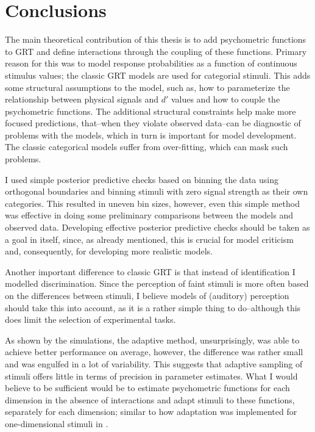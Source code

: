 \documentclass{article}\usepackage{knitr}
\begin{document}
\newpage


\section{Conclusions}

The main theoretical contribution of this thesis is to add psychometric functions to GRT and define interactions through the coupling of these functions. Primary reason for this was to model response probabilities as a function of continuous stimulus values; the classic GRT models are used for categorial stimuli. This adds some structural assumptions to the model, such as, how to parameterize the relationship between physical signals and $d'$ values and how to couple the psychometric functions. The additional structural constraints help make more focused predictions, that--when they violate observed data--can be diagnostic of problems with the models, which in turn is important for model development. The classic categorical models suffer from over-fitting, which can mask such problems.

I used simple posterior predictive checks based on binning the data using orthogonal boundaries and binning stimuli with zero signal strength as their own categories. This resulted in uneven bin sizes, however, even this simple method was effective in doing some preliminary comparisons between the models and observed data. Developing effective posterior predictive checks should be taken as a goal in itself, since, as already mentioned, this is crucial for model criticism and, consequently, for developing more realistic models.  

Another important difference to classic GRT is that instead of identification I modelled discrimination. Since the perception of faint stimuli is more often based on the differences between stimuli, I believe models of (auditory) perception should take this into account, as it is a rather simple thing to do--although this does limit the selection of experimental tasks.  

As shown by  the simulations,  the adaptive method, unsurprisingly, was able to achieve better performance on average, however, the difference was rather small and was engulfed in a lot of variability. This suggests that adaptive sampling of stimuli offers little in terms of precision in parameter estimates. What I would believe to be sufficient would be to estimate psychometric functions for each dimension in the absence of interactions and adapt stimuli to these functions, separately for each dimension; similar to how adaptation was implemented for one-dimensional stimuli in \citet{kontsevichtyler1999}. 
\end{document}
